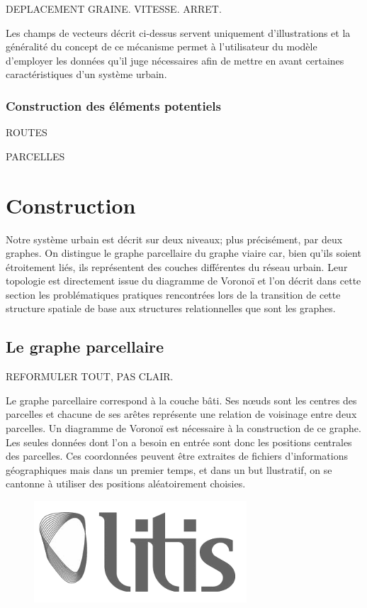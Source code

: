 \documentclass[12pt]{article}
\begin{document}
DEPLACEMENT GRAINE. VITESSE. ARRET.

Les champs de vecteurs décrit ci-dessus servent uniquement
d'illustrations et la généralité du concept de ce mécanisme permet à
l'utilisateur du modèle d'employer les données qu'il juge nécessaires
afin de mettre en avant certaines caractéristiques d'un système
urbain.

\subsubsection{Construction des éléments potentiels}

ROUTES

PARCELLES

\section{Construction}

Notre système urbain est décrit sur deux niveaux; plus précisément,
par deux graphes. On distingue le graphe parcellaire du graphe viaire
car, bien qu'ils soient étroitement liés, ils représentent des couches
différentes du réseau urbain. Leur topologie est directement issue du
diagramme de Voronoï et l'on décrit dans cette section les
problématiques pratiques rencontrées lors de la transition de cette
structure spatiale de base aux structures relationnelles que sont les
graphes.

\subsection{Le graphe parcellaire}

REFORMULER TOUT, PAS CLAIR.

Le graphe parcellaire correspond à la couche bâti. Ses n\oe uds sont
les centres des parcelles et chacune de ses arêtes représente une
relation de voisinage entre deux parcelles. Un diagramme de Voronoï
est nécessaire à la construction de ce graphe. Les seules données dont
l'on a besoin en entrée sont donc les positions centrales des
parcelles. Ces coordonnées peuvent être extraites de fichiers
d'informations géographiques mais dans un premier temps, et dans un
but llustratif, on se cantonne à utiliser des positions aléatoirement
choisies.

\begin{figure}
  \centering
  \includegraphics[width=.6\linewidth]{images/logo-litis.png}
  \caption{}
  \label{fig:construction-bati1}
\end{figure}
\end{document}
